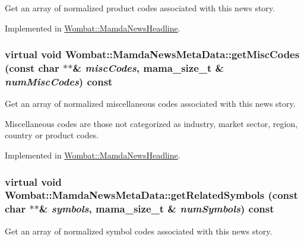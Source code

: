 Get an array of normalized product codes associated with this news story. 



Implemented in \hyperlink{classWombat_1_1MamdaNewsHeadline_d1b777bc5eab51d090ace0e858e15649}{Wombat::Mamda\-News\-Headline}.\hypertarget{classWombat_1_1MamdaNewsMetaData_548e87226465849d482b2644c103c67e}{
\subsubsection[getMiscCodes]{\setlength{\rightskip}{0pt plus 5cm}virtual void Wombat::Mamda\-News\-Meta\-Data::get\-Misc\-Codes (const char $\ast$$\ast$\& {\em misc\-Codes}, mama\_\-size\_\-t \& {\em num\-Misc\-Codes}) const}}
\label{classWombat_1_1MamdaNewsMetaData_548e87226465849d482b2644c103c67e}


Get an array of normalized miscellaneous codes associated with this news story. 

Miscellaneous codes are those not categorized as industry, market sector, region, country or product codes. 

Implemented in \hyperlink{classWombat_1_1MamdaNewsHeadline_e072447d35b0890cd27e694f02859705}{Wombat::Mamda\-News\-Headline}.\hypertarget{classWombat_1_1MamdaNewsMetaData_8ed97f443c8892110d53d7c2a42b8fbf}{
\subsubsection[getRelatedSymbols]{\setlength{\rightskip}{0pt plus 5cm}virtual void Wombat::Mamda\-News\-Meta\-Data::get\-Related\-Symbols (const char $\ast$$\ast$\& {\em symbols}, mama\_\-size\_\-t \& {\em num\-Symbols}) const}}
\label{classWombat_1_1MamdaNewsMetaData_8ed97f443c8892110d53d7c2a42b8fbf}


Get an array of normalized symbol codes associated with this news story. 



